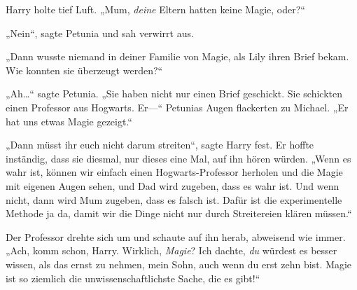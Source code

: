 Harry holte tief Luft. „Mum, \emph{deine} Eltern hatten keine Magie, oder?“

„Nein“, sagte Petunia und sah verwirrt aus.

„Dann wusste niemand in deiner Familie von Magie, als Lily ihren Brief bekam. Wie konnten sie überzeugt werden?“

„Ah…“ sagte Petunia. „Sie haben nicht nur einen Brief geschickt. Sie schickten einen Professor aus Hogwarts. Er—“ Petunias Augen flackerten zu Michael. „Er hat uns etwas Magie gezeigt.“

„Dann müsst ihr euch nicht darum streiten“, sagte Harry fest. Er hoffte inständig, dass sie diesmal, nur dieses eine Mal, auf ihn hören würden. „Wenn es wahr ist, können wir einfach einen Hogwarts-Professor herholen und die Magie mit eigenen Augen sehen, und Dad wird zugeben, dass es wahr ist. Und wenn nicht, dann wird Mum zugeben, dass es falsch ist. Dafür ist die experimentelle Methode ja da, damit wir die Dinge nicht nur durch Streitereien klären müssen.“

Der Professor drehte sich um und schaute auf ihn herab, abweisend wie immer. „Ach, komm schon, Harry. Wirklich, \emph{Magie}? Ich dachte, \emph{du} würdest es besser wissen, als das ernst zu nehmen, mein Sohn, auch wenn du erst zehn bist. Magie ist so ziemlich die unwissenschaftlichste Sache, die es gibt!“

